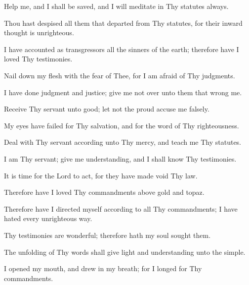 Help me, and I shall be saved, and I will meditate in Thy statutes always.

Thou hast despised all them that departed from Thy statutes, for their inward thought is unrighteous.

I have accounted as transgressors all the sinners of the earth; therefore have I loved Thy testimonies.

Nail down my flesh with the fear of Thee, for I am afraid of Thy judgments.

I have done judgment and justice; give me not over unto them that wrong me.

Receive Thy servant unto good; let not the proud accuse me falsely.

My eyes have failed for Thy salvation, and for the word of Thy righteousness.

Deal with Thy servant according unto Thy mercy, and teach me Thy statutes.

I am Thy servant; give me understanding, and I shall know Thy testimonies.

It is time for the Lord to act, for they have made void Thy law.

Therefore have I loved Thy commandments above gold and topaz.

Therefore have I directed myself according to all Thy commandments; I have hated every unrighteous way.

Thy testimonies are wonderful; therefore hath my soul sought them.

The unfolding of Thy words shall give light and understanding unto the simple.

I opened my mouth, and drew in my breath; for I longed for Thy commandments.
